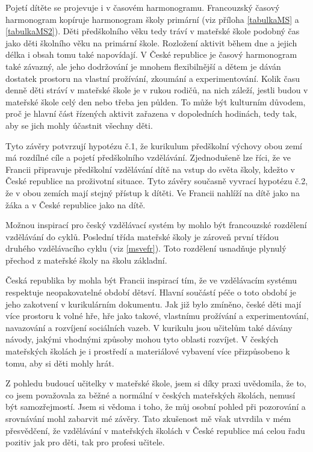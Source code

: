 Pojetí dítěte se projevuje i v časovém harmonogramu. Francouzský časový harmonogram kopíruje harmonogram školy primární (viz příloha \ref{tabulkaMS} a \ref{tabulkaMS2}). Děti předškolního věku tedy tráví v mateřské škole podobný čas jako děti školního věku na primární škole. Rozložení aktivit během dne a jejich délka i obsah tomu také napovídají. V České republice je časový harmonogram také závazný, ale jeho dodržování je mnohem flexibilnější a dětem je dáván dostatek prostoru na vlastní prožívání, zkoumání a experimentování. Kolik času denně  děti stráví v mateřské škole je v rukou rodičů, na nich záleží, jestli budou v mateřské škole celý den nebo třeba jen půlden. To může být kulturním důvodem, proč je hlavní část řízených aktivit zařazena v dopoledních hodinách, tedy tak, aby se jich mohly účastnit všechny děti. 

Tyto závěry potvrzují hypotézu č.1, že kurikulum předškolní výchovy obou zemí má rozdílné cíle a pojetí předškolního vzdělávání. Zjednodušeně lze říci, že ve Francii připravuje předškolní vzdělávání dítě na vstup do světa školy, kdežto v České republice na proživotní situace. Tyto závěry současně vyvrací hypotézu č.2, že v obou zemích mají stejný přístup k dítěti. Ve Francii nahlíží na dítě jako na žáka a v České republice jako na dítě. 

Možnou inspirací pro český vzdělávací systém by mohlo být francouzské rozdělení vzdělávání do cyklů. Poslední třída mateřské školy je zároveň první třídou druhého vzdělávacího cyklu (viz \ref{msvefr}). Toto rozdělení usnadňuje plynulý přechod z mateřské školy na školu základní. 

Česká republika by mohla být Francii inspirací tím, že ve vzdělávacím systému respektuje neopakovatelné období dětsví. Hlavní součástí péče o toto období je jeho zakotvení v kurikulárním dokumentu. Jak již bylo zmíněno, české děti mají více prostoru k volné hře, hře jako takové, vlastnímu prožívání a experimentování, navazování a rozvíjení sociálních vazeb. V kurikulu jsou učitelům také dávány návody, jakými vhodnými způsoby mohou tyto oblasti rozvíjet. V českých mateřských školách je i prostředí a materiálové vybavení více přizpůsobeno k tomu, aby si děti mohly hrát.

Z pohledu budoucí učitelky v mateřské škole, jsem si díky praxi uvědomila, že to, co jsem považovala za běžné a normální v českých mateřských školách, nemusí být samozřejmostí. Jsem si vědoma i toho, že můj osobní pohled při pozorování a srovnávání mohl zabarvit mé závěry. Tato zkušenost mě však utvrdila v mém přesvědčení, že vzdělávání v mateřských školách v České republice má celou řadu pozitiv jak pro děti, tak pro profesi učitele. 